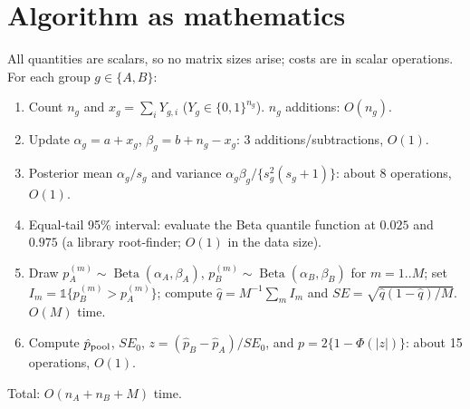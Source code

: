 \documentclass[11pt]{article}
\newcommand{\Beta}{\operatorname{Beta}}
\begin{document}
\section{Algorithm as mathematics}
All quantities are scalars, so no matrix sizes arise; costs are in scalar operations. For each group $g\in\{A,B\}$:
\begin{enumerate}
\item Count $n_g$ and $x_g=\sum_iY_{g,i}$ ($Y_g\in\{0,1\}^{n_g}$). $n_g$ additions: $O(n_g)$.
\item Update $\alpha_g=a+x_g$, $\beta_g=b+n_g-x_g$: 3 additions/subtractions, $O(1)$.
\item Posterior mean $\alpha_g/s_g$ and variance $\alpha_g\beta_g/\{s_g^2(s_g+1)\}$: about 8 operations, $O(1)$.
\item Equal-tail 95\% interval: evaluate the Beta quantile function at $0.025$ and $0.975$ (a library root-finder; $O(1)$ in the data size).
\item Draw $p_A^{(m)}\sim\Beta(\alpha_A,\beta_A)$, $p_B^{(m)}\sim\Beta(\alpha_B,\beta_B)$ for $m=1..M$; set $I_m=\mathbb 1\{p_B^{(m)}>p_A^{(m)}\}$; compute $\hat q=M^{-1}\sum_mI_m$ and $SE=\sqrt{\hat q(1-\hat q)/M}$. $O(M)$ time.
\item Compute $\hat p_{\rm pool}$, $SE_0$, $z=(\hat p_B-\hat p_A)/SE_0$, and $p=2\{1-\Phi(|z|)\}$: about 15 operations, $O(1)$.
\end{enumerate}
Total: $O(n_A+n_B+M)$ time.
\end{document}
